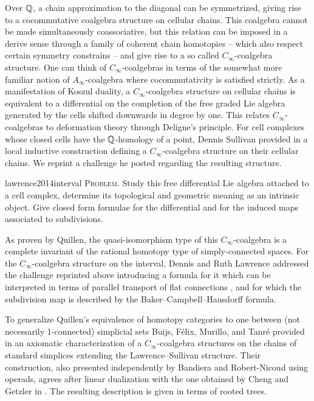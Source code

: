 Over $\mathbb{Q}$, a chain approximation to the diagonal can be symmetrized, giving rise to a cocommutative coalgebra structure on cellular chains.
This coalgebra cannot be made simultaneously coassociative, but this relation can be imposed in a derive sense through a family of coherent chain homotopies -- which also respect certain symmetry constrains -- and give rise to a so called $C_\infty$-coalgebra structure.
One can think of $C_\infty$-coalgebras in terms of the somewhat more familiar notion of $A_\infty$-coalgebra where cocommutativity is satisfied strictly.
As a manifestation of Koszul duality, a $C_\infty$-coalgebra structure on cellular chains is equivalent to a differential on the completion of the free graded Lie algebra generated by the cells shifted downwards in degree by one.
This relates $C_\infty$-coalgebras to deformation theory through Deligne's principle.
For cell complexes whose closed cells have the $\mathbb{Q}$-homology of a point, Dennis Sullivan provided in \cite{sullivan2007appendix} a local inductive construction defining a $C_\infty$-coalgebra structure on their cellular chains.
We reprint a challenge he posted regarding the resulting structure.
\begin{displaycquote}[p.2]{lawrence2014interval}
	\textsc{Problem}. Study this free differential Lie algebra attached to a cell complex, determine its topological and geometric meaning as an intrinsic object.
	Give closed form formulae for the differential and for the induced maps associated to subdivisions.
\end{displaycquote}
As proven by Quillen, the quasi-isomorphism type of this $C_\infty$-coalgebra is a complete invariant of the rational homotopy type of simply-connected spaces.
For the $C_\infty$-coalgebra structure on the interval, Dennis and Ruth Lawrence addressed the challenge reprinted above introducing a formula for it which can be interpreted in terms of parallel transport of flat connections \cite{lawrence2014interval}, and for which the subdivision map is described by the Baker--Campbell--Hausdorff formula.

To generalize Quillen's equivalence of homotopy categories to one between (not necessarily 1-connected) simplicial sets Buijs, F{\'e}lix, Murillo, and Tanr{\'e} provided in \cite{buijs2020liemodels} an axiomatic characterization of a $C_\infty$-coalgebra structures on the chains of standard simplices extending the Lawrence--Sullivan structure.
Their construction, also presented independently by Bandiera and Robert-Nicoud using operads, agrees after linear dualization with the one obtained by Cheng and Getzler in \cite{getzler2008transfering}.
The resulting description is given in terms of rooted trees.

